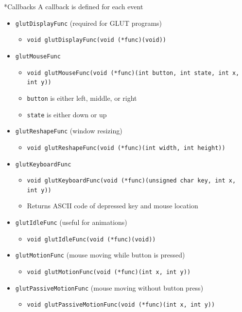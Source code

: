 \documentclass[12pt, landscape]{article}
\makeatletter
\renewcommand{\subsection}{
  \@startsection{subsection}{2}{0pt}{1ex}{1.2ex} {\raggedleft\normalfont\normalsize\bfseries\fbox}}
\newcommand{\ic}[1]{\lstinline{#1}}
\makeatother
\begin{document}
\begin{multicols*}{3}
  \subsection*{Callbacks} \noindent
    A callback is defined for each event
    \begin{itemize}[leftmargin=*]
      \item \ic{glutDisplayFunc} (required for GLUT programs)
        \begin{itemize}[leftmargin=*]
          \item \ic{void glutDisplayFunc(void (*func)(void))}
        \end{itemize}
      \item \ic{glutMouseFunc}
        \begin{itemize}[leftmargin=*]
          \item \ic{void glutMouseFunc(void (*func)(int button, int state, int x, int y))}
          \item \ic{button} is either left, middle, or right
          \item \ic{state} is either down or up
        \end{itemize}
      \item \ic{glutReshapeFunc} (window resizing)
        \begin{itemize}[leftmargin=*]
          \item \ic{void glutReshapeFunc(void (*func)(int width, int height))}
        \end{itemize}
      \item \ic{glutKeyboardFunc}
        \begin{itemize}[leftmargin=*]
          \item \ic{void glutKeyboardFunc(void (*func)(unsigned char key, int x, int y))}
          \item Returns ASCII code of depressed key and mouse location
        \end{itemize}
      \item \ic{glutIdleFunc} (useful for animations)
        \begin{itemize}[leftmargin=*]
          \item \ic{void glutIdleFunc(void (*func)(void))}
        \end{itemize}
      \item \ic{glutMotionFunc} (mouse moving while button is pressed)
        \begin{itemize}[leftmargin=*]
          \item \ic{void glutMotionFunc(void (*func)(int x, int y))}
        \end{itemize}
      \item \ic{glutPassiveMotionFunc} (mouse moving without button press)
        \begin{itemize}[leftmargin=*]
          \item \ic{void glutPassiveMotionFunc(void (*func)(int x, int y))}
        \end{itemize}
    \end{itemize}

\end{multicols*}
\end{document}
